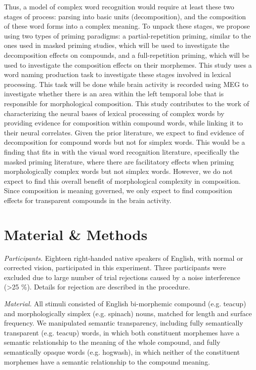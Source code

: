 \documentclass{frontiersSCNS}
\begin{document}
	Thus, a model of complex word recognition would require at least these two stages of process: parsing into basic units (decomposition), and the composition of these word forms into a complex meaning. To unpack these stages, we propose using two types of priming paradigms: a partial-repetition priming, similar to the ones used in masked priming studies, which will be used to investigate the decomposition effects on compounds, and a full-repetition priming, which will be used to investigate the composition effects on their morphemes. This study uses a word naming production task to investigate these stages involved in lexical processing. This task will be done while brain activity is recorded using MEG to investigate whether there is an area within the left temporal lobe that is responsible for morphological composition. This study contributes to the work of characterizing the neural bases of lexical processing of complex words by providing evidence for composition within compound words, while linking it to their neural correlates. Given the prior literature, we expect to find evidence of decomposition for compound words but not for simplex words. This would be a finding that fits in with the visual word recognition literature, specifically the masked priming literature, where there are facilitatory effects when priming morphologically complex words but not simplex words. However, we do not expect to find this overall benefit of morphological complexity in composition. Since composition is meaning governed, we only expect to find composition effects for transparent compounds in the brain activity. 

\section{Material \& Methods}

\textit{Participants.} Eighteen right-handed native speakers of English, with normal or corrected vision, participated in this experiment. Three participants were excluded due to large number of trial rejections caused by a noise interference (\textgreater 25 \%). Details for rejection are described in the procedure.

\textit{Material.}  All stimuli consisted of English bi-morphemic compound (e.g. teacup) and morphologically simplex (e.g. spinach) nouns, matched for length and surface frequency. We manipulated semantic transparency, including fully semantically transparent (e.g. teacup) words, in which both constituent morphemes have a semantic relationship to the meaning of the whole compound, and fully semantically opaque words (e.g. hogwash), in which neither of the constituent morphemes have a semantic relationship to the compound meaning.
\end{document}
